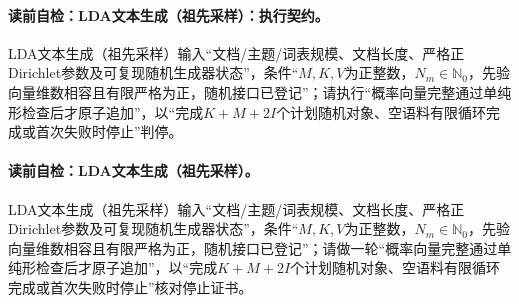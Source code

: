 \begingroup\SetAlgoLined
\paragraph{读前自检：LDA文本生成（祖先采样）：执行契约。}LDA文本生成（祖先采样）输入“文档/主题/词表规模、文档长度、严格正Dirichlet参数及可复现随机生成器状态”，条件“$M,K,V$为正整数，$N_m\in\mathbb N_0$，先验向量维数相容且有限严格为正，随机接口已登记”；请执行“概率向量完整通过单纯形检查后才原子追加”，以“完成$K+M+2I$个计划随机对象、空语料有限循环完成或首次失败时停止”判停。\par
\paragraph{读前自检：LDA文本生成（祖先采样）。}LDA文本生成（祖先采样）输入“文档/主题/词表规模、文档长度、严格正Dirichlet参数及可复现随机生成器状态”，条件“$M,K,V$为正整数，$N_m\in\mathbb N_0$，先验向量维数相容且有限严格为正，随机接口已登记”；请做一轮“概率向量完整通过单纯形检查后才原子追加”，以“完成$K+M+2I$个计划随机对象、空语料有限循环完成或首次失败时停止”核对停止证书。\par

